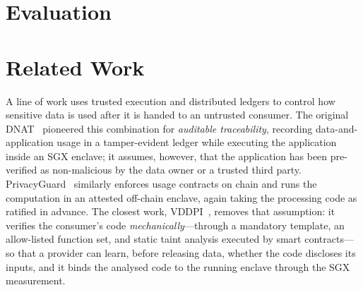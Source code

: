 \documentclass[runningheads]{llncs}
\begin{document}


\section{Evaluation}
\label{sec:evaluation}






\section{Related Work}\label{sec:related-work}



A line of work uses trusted execution and distributed ledgers to control how sensitive data
is used after it is handed to an untrusted consumer. The original
DNAT~\cite{nascimento2020dnat} pioneered this combination for \emph{auditable traceability},
recording data-and-application usage in a tamper-evident ledger while executing the
application inside an SGX enclave; it assumes, however, that the application has been
pre-verified as non-malicious by the data owner or a trusted third party.
PrivacyGuard~\cite{xiao2020privacyguard} similarly enforces usage contracts on chain and
runs the computation in an attested off-chain enclave, again taking the processing code as
ratified in advance. The closest work, VDDPI~\cite{tokuda2026vddpi}, removes that
assumption: it verifies the consumer's code \emph{mechanically}---through a mandatory
template, an allow-listed function set, and static taint analysis executed by smart
contracts---so that a provider can learn, before releasing data, whether the code discloses
its inputs, and it binds the analysed code to the running enclave through the SGX
measurement.
\end{document}
